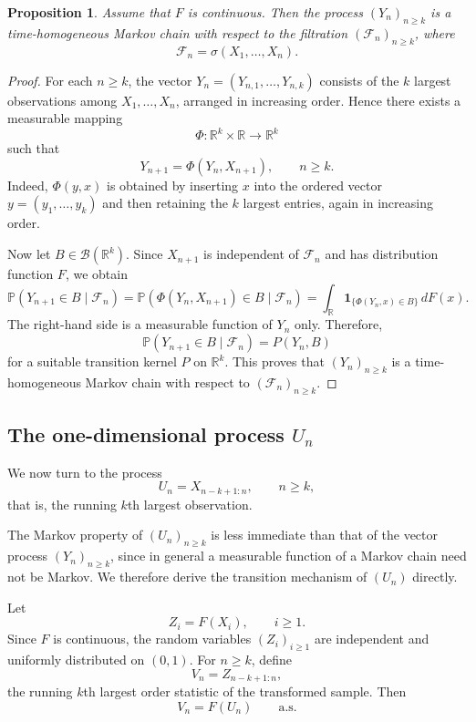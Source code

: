 \documentclass[12pt]{article}
\newtheorem{proposition}[theorem]{Proposition}
\theoremstyle{definition}
\begin{document}
\begin{proposition}
\label{prop:vector-process-markovy}
Assume that $F$ is continuous. Then the process $(Y_n)_{n\ge k}$ is a time-homogeneous Markov chain with respect to the filtration $(\mathcal F_n)_{n\ge k}$, where
\[
\mathcal F_n=\sigma(X_1,\dots,X_n).
\]
\end{proposition}
\begin{proof}
For each $n\ge k$, the vector $Y_n=(Y_{n,1},\dots,Y_{n,k})$ consists of the $k$ largest observations among $X_1,\dots,X_n$, arranged in increasing order. Hence there exists a measurable mapping
\[
\Phi:\mathbb R^k\times\mathbb R\to\mathbb R^k
\]
such that
\[
Y_{n+1}=\Phi(Y_n,X_{n+1}), \qquad n\ge k.
\]
Indeed, $\Phi(y,x)$ is obtained by inserting $x$ into the ordered vector $y=(y_1,\dots,y_k)$ and then retaining the $k$ largest entries, again in increasing order.

Now let $B\in\mathcal B(\mathbb R^k)$. Since $X_{n+1}$ is independent of $\mathcal F_n$ and has distribution function $F$, we obtain
\[
\mathbb P(Y_{n+1}\in B\mid \mathcal F_n)
=
\mathbb P(\Phi(Y_n,X_{n+1})\in B\mid \mathcal F_n)
=
\int_{\mathbb R}\mathbf 1_{\{\Phi(Y_n,x)\in B\}}\,dF(x).
\]
The right-hand side is a measurable function of $Y_n$ only. Therefore,
\[
\mathbb P(Y_{n+1}\in B\mid \mathcal F_n)
=
P(Y_n,B)
\]
for a suitable transition kernel \(P\) on \(\mathbb R^k\). This proves that $(Y_n)_{n\ge k}$ is a time-homogeneous Markov chain with respect to $(\mathcal F_n)_{n\ge k}$.
\end{proof}

\subsection{The one-dimensional process $U_n$}
\label{subsec:one-dimensional-process}

We now turn to the process
\[
U_n=X_{n-k+1:n}, \qquad n\ge k,
\]
that is, the running $k$th largest observation.

The Markov property of $(U_n)_{n\ge k}$ is less immediate than that of the vector process $(Y_n)_{n\ge k}$, since in general a measurable function of a Markov chain need not be Markov. We therefore derive the transition mechanism of $(U_n)$ directly.

\medskip

Let
\[
Z_i=F(X_i), \qquad i\ge1.
\]
Since $F$ is continuous, the random variables $(Z_i)_{i\ge1}$ are independent and uniformly distributed on $(0,1)$. For $n\ge k$, define
\[
V_n=Z_{n-k+1:n},
\]
the running $k$th largest order statistic of the transformed sample. Then
\[
V_n=F(U_n) \qquad \text{a.s.}
\]
\end{document}
